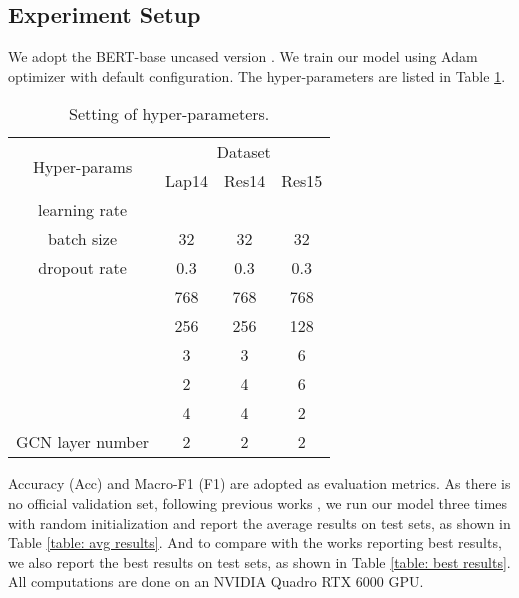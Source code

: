 \subsection{Experiment Setup}
We adopt the BERT-base uncased version \cite{bert}. We train our model using Adam optimizer \cite{Adam} with default configuration.
The hyper-parameters are listed in Table \ref{table: hyper-param}.
\begin{table}[t]
\fontsize{9}{11}\selectfont
\centering
\caption{Setting of hyper-parameters.}
\begin{tabular}{c|ccc}
\toprule
\multirow{2}{*}{Hyper-params} & \multicolumn{3}{c}{Dataset} \\\cline{2-4}
                              & Lap14   & Res14   & Res15   \\ \midrule
         learning rate        &   &         &         \\
          batch size          & 32     &   32    &   32    \\
            dropout rate     &  0.3    &    0.3  &   0.3   \\
                         &  768    &  768    &  768   \\ 
                 &  256     &    256     &   128      \\
                 &  3     &   3     &     6    \\
                &  2     &   4    &    6     \\
                 &   4    &      4   &    2    \\
GCN layer number             &   2      &    2     &   2      \\
           \bottomrule
\end{tabular}
\label{table: hyper-param}
\end{table}
Accuracy (Acc) and Macro-F1 (F1) are adopted as evaluation metrics.
As there is no official validation set, following previous works \cite{asgcn,bigcn,DGEDT}, we run our model three times with random initialization and report the average results on test sets, as shown in Table \ref{table: avg results}.
And to compare with the works reporting best results, we also report the best results on test sets, as shown in Table \ref{table: best results}.
All computations are done on an NVIDIA Quadro RTX 6000 GPU.

\begin{comment}
Besides standard KaGRMN-DSG (M), we also evaluate some variants (M\textasciitilde M) of M to empirically verify its effectiveness from different perspectives.
M: DSG-Net is evaluated as a single model.
M: we replace the input description with the aspect so no aspect knowledge is leveraged.
M: KaGR-MN is evaluated as a single model.
M: KI Gate is removed.
\end{comment}

